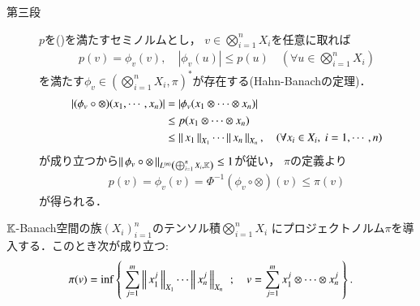 \begin{prf}
\begin{description}
			\item[第三段]
				$p$を()を満たすセミノルムとし，
				$v \in \bigotimes_{i=1}^n X_i$を任意に取れば
				\begin{align}
					p(v) = \phi_v(v),
					\quad |\phi_v(u)| \leq p(u)
					\quad (\forall u \in \bigotimes_{i=1}^n X_i)
				\end{align}
				を満たす$\phi_v \in (\bigotimes_{i=1}^n X_i,\pi)^*$が存在する(Hahn-Banachの定理)．
				\begin{align}
					\left| (\phi_v \circ \otimes)(x_1,\cdots,x_n) \right|
					&= \left|\phi_v(x_1 \otimes \cdots \otimes x_n)\right| \\ 
					&\leq p(x_1 \otimes \cdots \otimes x_n) \\
					&\leq \Norm{x_1}{X_1} \cdots \Norm{x_n}{X_n},
					\quad (\forall x_i \in X_i,\ i=1,\cdots,n)
				\end{align}
				が成り立つから$\Norm{\phi_v \circ \otimes}{\ContLn{\bigoplus_{i=1}^n X_i}{\K}{n}} \leq 1$が従い，
				$\pi$の定義より
				\begin{align}
					p(v) = \phi_v(v) = \Phi^{-1}(\phi_v \circ \otimes)(v)
					\leq \pi(v)
				\end{align}
				が得られる．
				\QED
		\end{description}
	\end{prf}
	
	\begin{screen}
		\begin{thm}[プロジェクティブノルムの表現]\label{thm:expression_of_projective_norm}
			$\K$-Banach空間の族$(X_i)_{i=1}^n$のテンソル積$\bigotimes_{i=1}^n X_i$
			にプロジェクトノルム$\pi$を導入する．このとき次が成り立つ:
			\begin{align}
				\pi(v) = \inf{}{\Set{\sum_{j=1}^m \Norm{x^j_1}{X_1} \cdots \Norm{x^j_n}{X_n}}{
					v = \sum_{j=1}^m x^j_1 \otimes \cdots \otimes x^j_n}}.
			\end{align}
		\end{thm}
	\end{screen}
	
